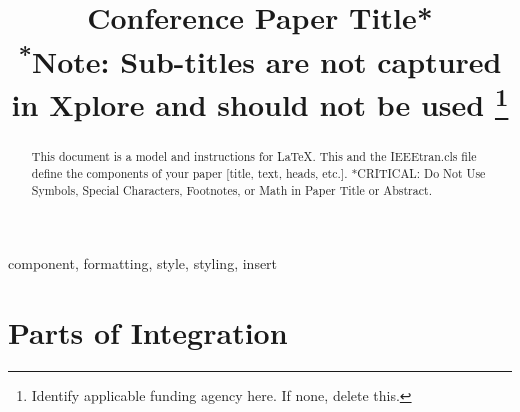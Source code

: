 \documentclass[conference]{IEEEtran}
\begin{document}
\title{Conference Paper Title*\\
{\footnotesize \textsuperscript{*}Note: Sub-titles are not captured in Xplore and
should not be used}
\thanks{Identify applicable funding agency here. If none, delete this.}
}

\author{
\and
{}
\and
{}
\and
{}
}

\maketitle

\begin{abstract}
This document is a model and instructions for \LaTeX.
This and the IEEEtran.cls file define the components of your paper [title, text, heads, etc.]. *CRITICAL: Do Not Use Symbols, Special Characters, Footnotes, 
or Math in Paper Title or Abstract.
\end{abstract}

\begin{IEEEkeywords}
component, formatting, style, styling, insert
\end{IEEEkeywords}

\newpage
\section{Parts of Integration}
\end{document}
